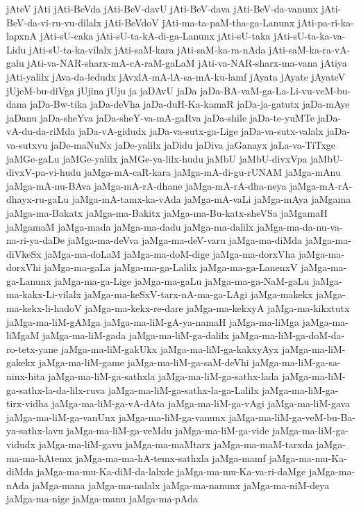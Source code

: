 {jAteV
jAti
jAti-BeVda
jAti-BeV-davU
jAti-BeV-dava
jAti-BeV-da-vanunx
jAti-BeV-da-vi-ru-vu-dilalx
jAti-BeVdoV
jAti-ma-ta-paM-tha-ga-Lanunx
jAti-pa-ri-ka-lapxnA
jAti-sU-caka
jAti-sU-ta-kA-di-ga-Lanunx
jAti-sU-taka
jAti-sU-ta-ka-va-Lidu
jAti-sU-ta-ka-vilalx
jAti-saM-kara
jAti-saM-ka-ra-nAda
jAti-saM-ka-ra-vA-galu
jAti-va-NAR-sharx-mA-cA-raM-gaLaM
jAti-va-NAR-sharx-ma-vana
jAtiya
jAti-yalilx
jAva-da-ledudx
jAvxlA-mA-lA-sa-mA-ku-lamf
jAyata
jAyate
jAyateV
jUjeM-bu-diVga
jUjina
jUju
ja
jaDAvU
jaDa
jaDa-BA-vaM-ga-La-Li-vu-veM-bu-dana
jaDa-Bw-tika
jaDa-deVha
jaDa-duH-Ka-kamaR
jaDa-ja-gatutx
jaDa-mAye
jaDanu
jaDa-sheYva
jaDa-sheY-va-mA-gaRva
jaDa-shile
jaDa-te-yuMTe
jaDa-vA-du-da-riMda
jaDa-vA-gidudx
jaDa-va-sutx-ga-Lige
jaDa-va-sutx-valalx
jaDa-va-sutxvu
jaDe-maNuNx
jaDe-yalilx
jaDidu
jaDiva
jaGanayx
jaLa-va-TiTxge
jaMGe-gaLu
jaMGe-yalilx
jaMGe-ya-lilx-hudu
jaMbU
jaMbU-divxVpa
jaMbU-divxV-pa-vi-hudu
jaMga-mA-caR-kara
jaMga-mA-di-gu-rUNAM
jaMga-mAnu
jaMga-mA-nu-BAva
jaMga-mA-rA-dhane
jaMga-mA-rA-dha-neya
jaMga-mA-rA-dhayx-ru-gaLu
jaMga-mA-tamx-ka-vAda
jaMga-mA-vaLi
jaMga-mAya
jaMgama
jaMga-ma-Bakatx
jaMga-ma-Bakitx
jaMga-ma-Bu-katx-sheVSa
jaMgamaH
jaMgamaM
jaMga-mada
jaMga-ma-dadu
jaMga-ma-dalilx
jaMga-ma-da-nu-va-na-ri-ya-daDe
jaMga-ma-deVva
jaMga-ma-deV-varu
jaMga-ma-diMda
jaMga-ma-diVkeSx
jaMga-ma-doLaM
jaMga-ma-doM-dige
jaMga-ma-dorxVha
jaMga-ma-dorxVhi
jaMga-ma-gaLa
jaMga-ma-ga-Lalilx
jaMga-ma-ga-LanenxV
jaMga-ma-ga-Lanunx
jaMga-ma-ga-Lige
jaMga-ma-gaLu
jaMga-ma-ga-NaM-gaLu
jaMga-ma-kakx-Li-vilalx
jaMga-ma-keSxV-tarx-nA-ma-ga-LAgi
jaMga-makekx
jaMga-ma-kekx-li-hadoV
jaMga-ma-kekx-re-dare
jaMga-ma-kekxyA
jaMga-ma-kikxtutx
jaMga-ma-liM-gAMga
jaMga-ma-liM-gA-ya-namaH
jaMga-ma-liMga
jaMga-ma-liMgaM
jaMga-ma-liM-gada
jaMga-ma-liM-ga-dalilx
jaMga-ma-liM-ga-doM-da-ro-tetx-yane
jaMga-ma-liM-gakUkx
jaMga-ma-liM-ga-kakxyAyx
jaMga-ma-liM-gakekx
jaMga-ma-liM-game
jaMga-ma-liM-ga-saM-deVhi
jaMga-ma-liM-ga-sa-ninx-hita
jaMga-ma-liM-ga-sathxla
jaMga-ma-liM-ga-sathx-lada
jaMga-ma-liM-ga-sathx-la-da-lilx-ruva
jaMga-ma-liM-ga-sathx-la-ga-Lalilx
jaMga-ma-liM-ga-tirx-vidha
jaMga-ma-liM-ga-vA-dAta
jaMga-ma-liM-ga-vAgi
jaMga-ma-liM-gava
jaMga-ma-liM-ga-vanUnx
jaMga-ma-liM-ga-vanunx
jaMga-ma-liM-ga-veM-bu-Ba-ya-sathx-lavu
jaMga-ma-liM-ga-veMdu
jaMga-ma-liM-ga-vide
jaMga-ma-liM-ga-vidudx
jaMga-ma-liM-gavu
jaMga-ma-maMtarx
jaMga-ma-maM-tarxda
jaMga-ma-ma-hAtemx
jaMga-ma-ma-hA-temx-sathxla
jaMga-mamf
jaMga-ma-mu-Ka-diMda
jaMga-ma-mu-Ka-diM-da-lalxde
jaMga-ma-mu-Ka-va-ri-daMge
jaMga-ma-nAda
jaMga-mana
jaMga-ma-nalalx
jaMga-ma-nanunx
jaMga-ma-niM-deya
jaMga-ma-nige
jaMga-manu
jaMga-ma-pAda
}
